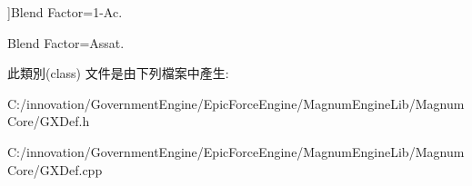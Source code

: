 \begin{Desc}
\begin{description}
{}]Blend Factor=1-\/\+Ac. \item[{\em 
Src\+Alpha\+Saturate\hypertarget{class_i_dream_sky_1_1_g_x_blend_factor_a4226ff82883fba994b921c202fc536e3aa50be0170753b8d33753b4c886569cc6}{}\label{class_i_dream_sky_1_1_g_x_blend_factor_a4226ff82883fba994b921c202fc536e3aa50be0170753b8d33753b4c886569cc6}
}]Blend Factor=Assat. \end{description}
\end{Desc}


此類別(class) 文件是由下列檔案中產生\+:\begin{DoxyCompactItemize}
\item 
C\+:/innovation/\+Government\+Engine/\+Epic\+Force\+Engine/\+Magnum\+Engine\+Lib/\+Magnum\+Core/G\+X\+Def.\+h\item 
C\+:/innovation/\+Government\+Engine/\+Epic\+Force\+Engine/\+Magnum\+Engine\+Lib/\+Magnum\+Core/G\+X\+Def.\+cpp\end{DoxyCompactItemize}
